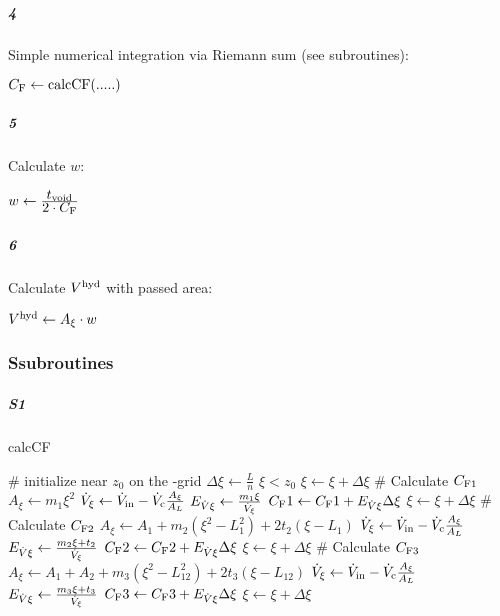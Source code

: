 \subparagraph{4}
Simple numerical integration via Riemann sum (see subroutines):
\begin{algorithmic}
  \State $C_\text{F} \leftarrow \text{calcCF}(.....)$
\end{algorithmic}
\subparagraph{5}
Calculate $w$:
\begin{algorithmic}
\State $w \leftarrow \frac{\displaystyle t_\text{void}}{\displaystyle 2\cdot C_\text{F}} $
\end{algorithmic}
\begin{comment}
\subparagraph{7}
Calculate passed channel area $A$:
\begin{algorithmic}
  \If{$ z_0 \geqq L_1$}
\State  $ A_z \leftarrow (L_{12} - z_0)\cdot( m_2  (L_{12} + z_0) + t_2 ) +  A_3$
\Else
\State  $ A_z \leftarrow  m_1 \cdot (L_1^2 - z_0^2) + A_2 + A_3 $
\EndIf
\end{algorithmic}
\end{comment}

\subparagraph{6}
Calculate $V^\text{hyd}$ with passed area:
\begin{algorithmic}
  \State $V^\text{hyd} \leftarrow A_\xi \cdot w$
\end{algorithmic}
\clearpage
\subsubsection*{S\quad subroutines}
\vspace*{-1.2ex}
\subparagraph{S1} calcCF
\vspace*{-1.2ex}
\begin{algorithmic}
  \State \tiny \# initialize \xi near $z_0$ on the \xi-grid \normalsize
  \State $\Delta\xi \leftarrow \frac{L}{n}$
  \State $\xi < z_0$
  \State $\xi \leftarrow \xi + \Delta\xi$
  \EndWhile
  \State \tiny \# Calculate $C_\text{F1}$ \normalsize
  \State  $A_\xi \leftarrow m_1 \xi^2 $
  \State $ \dot{V}_\xi \leftarrow \dot{V}_\text{in} - \dot{V}_\text{c} \frac{A_\xi}{A_L} $ 
  \State $E_{\dot{V}\xi} \leftarrow \frac{m_1\xi}{\dot{V}_\xi} $
  \State $C_\text{F}1 \leftarrow C_\text{F}1 + E_{\dot{V}\xi} \Delta\xi$
  \State $\xi \leftarrow \xi + \Delta\xi$
  \EndWhile
  \State \tiny \#  Calculate $C_\text{F2}$ \normalsize
  \State $A_\xi \leftarrow A_1 + m_2 \left( \xi^2 - L_1^2 \right) + 2 t_2\left(\xi - L_1\right) $
  \State $ \dot{V}_\xi \leftarrow \dot{V}_\text{in} - \dot{V}_\text{c} \frac{A_\xi}{A_L} $ 
  \State $E_{\dot{V}\xi} \leftarrow \frac{m_2\xi + t_2}{\dot{V}_\xi} $
  \State $C_\text{F}2 \leftarrow C_\text{F}2 + E_{\dot{V}\xi} \Delta\xi$
  \State $\xi \leftarrow \xi + \Delta\xi$
  \EndWhile
  \State \tiny \#  Calculate $C_\text{F3}$ \normalsize
  \State $A_\xi \leftarrow A_1 + A_2 + m_3 \left( \xi^2 - L_{12}^2 \right) + 2 t_3\left(\xi - L_{12}\right) $
  \State $ \dot{V}_\xi \leftarrow \dot{V}_\text{in} - \dot{V}_\text{c} \frac{A_\xi}{A_L} $ 
  \State $E_{\dot{V}\xi} \leftarrow \frac{m_3\xi + t_3}{\dot{V}_\xi} $
  \State $C_\text{F}3 \leftarrow C_\text{F}3 + E_{\dot{V}\xi} \Delta\xi $
  \State $\xi \leftarrow \xi + \Delta\xi $
  \EndWhile
\end{algorithmic}
\vspace*{-2.0ex}
